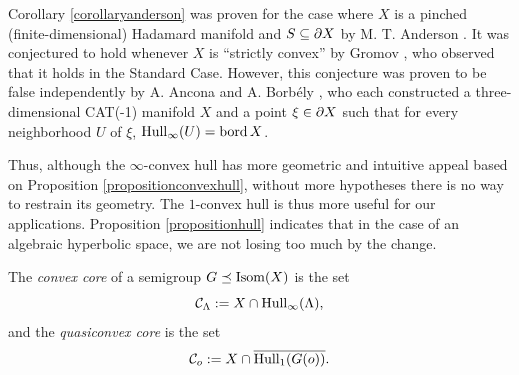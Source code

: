 \begin{remark}
Corollary \ref{corollaryanderson} was proven for the case where $X$ is a pinched (finite-dimensional) Hadamard manifold and $S\subseteq\partial X$ by M. T. Anderson \cite[Theorem 3.3]{Anderson}. It was conjectured to hold whenever $X$ is ``strictly convex'' by Gromov \cite[p.11]{Gromov1}, who observed that it holds in the Standard Case. However, this conjecture was proven to be false independently by A. Ancona \cite[Corollary C]{Ancona} and A. Borb\'ely \cite[Theorem 1]{Borbely}, who each constructed a three-dimensional CAT(-1) manifold $X$ and a point $\xi\in\partial X$ such that for every neighborhood $U$ of $\xi$, $\operatorname{Hull}_\infty(U) = \operatorname{bord} X$.%



Thus, although the $\infty$-convex hull has more geometric and intuitive appeal based on Proposition \ref{propositionconvexhull}, without more hypotheses there is no way to restrain its geometry. The $1$-convex hull is thus more useful for our applications. Proposition \ref{propositionhull} indicates that in the case of an algebraic hyperbolic space, we are not losing too much by the change.
\end{remark}


\begin{definition}
\label{definitionconvexcore}
The \emph{convex core} of a semigroup $G\preceq\operatorname{Isom}(X)$ is the set
\[
\mathcal C_\Lambda := X\cap \operatorname{Hull}_\infty(\Lambda),
\]
and the \emph{quasiconvex core} is the set
\[
\mathcal C_o := X\cap \overline{\operatorname{Hull}_1(G(o))}.
\]
\end{definition}

